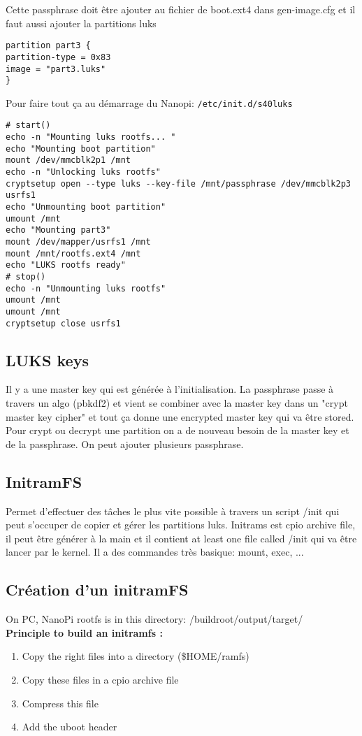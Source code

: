 Cette passphrase doit être ajouter au fichier de boot.ext4 dans gen-image.cfg et il faut aussi ajouter la partitions luks
\begin{lstlisting}[style=bash]
partition part3 {
partition-type = 0x83
image = "part3.luks"
}
\end{lstlisting}
Pour faire tout ça au démarrage du Nanopi: \verb!/etc/init.d/s40luks!
\begin{lstlisting}[style=bash]
# start()
echo -n "Mounting luks rootfs... "
echo "Mounting boot partition"
mount /dev/mmcblk2p1 /mnt
echo -n "Unlocking luks rootfs"
cryptsetup open --type luks --key-file /mnt/passphrase /dev/mmcblk2p3
usrfs1
echo "Unmounting boot partition"
umount /mnt
echo "Mounting part3"
mount /dev/mapper/usrfs1 /mnt
mount /mnt/rootfs.ext4 /mnt
echo "LUKS rootfs ready"
# stop()
echo -n "Unmounting luks rootfs"
umount /mnt
umount /mnt
cryptsetup close usrfs1
\end{lstlisting}
\subsection{LUKS keys}
Il y a une master key qui est générée à l'initialisation. La passphrase passe à travers un algo (pbkdf2) et vient se combiner avec la master key dans un "crypt master key cipher" et tout ça donne une encrypted master key qui va être stored. Pour crypt ou decrypt une partition on a de nouveau besoin de la master key et de la passphrase. On peut ajouter plusieurs passphrase.

\subsection{InitramFS}
Permet d'effectuer des tâches le plus vite possible à travers un script /init qui peut s'occuper de copier et gérer les partitions luks. Initrams est cpio archive file, il peut être générer à la main et il contient at least one file called /init qui va être lancer par le kernel. Il a des commandes très basique: mount, exec, ...

\subsection{Création d'un initramFS}
On PC, NanoPi rootfs is in this directory: /buildroot/output/target/\\
\textbf{Principle to build an initramfs :}
\begin{enumerate}
\item Copy the right files into a directory (\$HOME/ramfs)
\item Copy these files in a cpio archive file
\item Compress this file
\item Add the uboot header
\end{enumerate}
